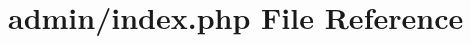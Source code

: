 \hypertarget{admin_2index_8php}{}\section{admin/index.php File Reference}
\label{admin_2index_8php}
